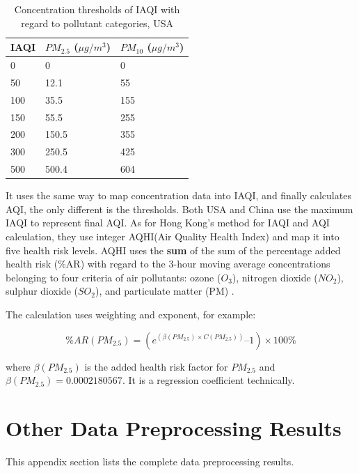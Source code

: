 \begin{table}[!htbp]
    \centering
    \caption{Concentration thresholds of IAQI with regard to pollutant categories, USA}
    \label{table:IAQI-thresholds-USA}
    \begin{tabular}{|l|l|l|}
    \hline
    IAQI & $PM_{2.5}$ ($\mu g/m^3$) & $PM_{10}$ ($\mu g/m^3$) \\ \hline
    0    & 0     & 0   \\ \hline
    50   & 12.1  & 55  \\ \hline
    100  & 35.5  & 155 \\ \hline
    150  & 55.5  & 255 \\ \hline
    200  & 150.5 & 355 \\ \hline
    300  & 250.5 & 425 \\ \hline
    500  & 500.4 & 604 \\ \hline
    \end{tabular}
\end{table}

It uses the same way to map concentration data into IAQI, and finally calculates AQI, the only different is the thresholds. Both USA and China use the maximum IAQI to represent final AQI. As for Hong Kong's method for IAQI and AQI calculation, they use integer AQHI(Air Quality Health Index) and map it into five health risk levels. AQHI uses the \textbf{sum} of the sum of the percentage added health risk (\%AR) with regard to the 3-hour moving average concentrations belonging to four criteria of air pollutants: ozone ($O_3$), nitrogen dioxide ($NO_2$), sulphur dioxide ($SO_2$), and particulate matter (PM) \cite{aqhi2018}.

The calculation uses weighting and exponent, for example:

\begin{equation}
    \%AR(PM_{2.5}) = (e^{(\beta(PM_{2.5})\times C(PM_{2.5}))} – 1) \times 100\%
\end{equation}

where $\beta(PM_{2.5})$ is the added health risk factor for $PM_{2.5}$ and $\beta(PM_{2.5})=0.0002180567$. It is a regression coefficient technically.


\chapter{Other Data Preprocessing Results}\label{chapter:other_data_preprocessing_results}

This appendix section lists the complete data preprocessing results.

